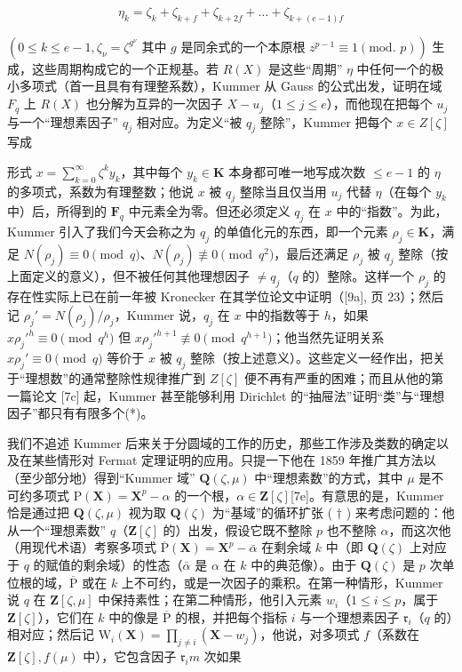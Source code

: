 \[
\eta_ {k} = \zeta_ {k} + \zeta_ {k + f} + \zeta_ {k + 2 f} + \dots + \zeta_ {k + (e - 1) f}
\]

\((0 \leqslant k \leqslant e - 1, \zeta_{\nu} = \zeta^{g^{\nu}} \text{ 其中 } g \text{ 是同余式的一个本原根 } z^{p-1} \equiv 1 (\text{mod. } p))\) 生成，这些周期构成它的一个正规基。若 \(R(X)\) 是这些“周期” \(\eta\) 中任何一个的极小多项式（首一且具有有理整系数），Kummer 从 Gauss 的公式出发，证明在域 \(F_q\) 上 \(R(X)\) 也分解为互异的一次因子 \(X - u_j\)（\(1 \leqslant j \leqslant e\)），而他现在把每个 \(u_j\) 与一个“理想素因子” \(q_j\) 相对应。为定义“被 \(q_j\) 整除”，Kummer 把每个 \(x \in Z[\zeta]\) 写成

形式 \(x = \sum_{k=0}^{\infty} \zeta^k y_k\)，其中每个 \(y_k \in \mathbf{K}\) 本身都可唯一地写成次数 \(\leqslant e - 1\) 的 \(\eta\) 的多项式，系数为有理整数；他说 \(x\) 被 \(q_j\) 整除当且仅当用 \(u_j\) 代替 \(\eta\)（在每个 \(y_k\) 中）后，所得到的 \(\mathbf{F}_q\) 中元素全为零。但还必须定义 \(q_j\) 在 \(x\) 中的“指数”。为此，Kummer 引入了我们今天会称之为 \(q_j\) 的单值化元的东西，即一个元素 \(\rho_j \in \mathbf{K}\)，满足 \(N(\rho_j) \equiv 0 \pmod{q}\)、\(N(\rho_j) \not\equiv 0 \pmod{q^2}\)，最后还满足 \(\rho_j\) 被 \(q_j\) 整除（按上面定义的意义），但不被任何其他理想因子 \(\neq q_j\)（\(q\) 的）整除。这样一个 \(\rho_j\) 的存在性实际上已在前一年被 Kronecker 在其学位论文中证明（{[}9a{]}, 页 23）；然后记 \(\rho_j' = N(\rho_j)/\rho_j\)，Kummer 说，\(q_j\) 在 \(x\) 中的指数等于 \(h\)，如果 \(x\rho_j'^h \equiv 0 \pmod{q^h}\) 但 \(x\rho_j'^{h+1} \not\equiv 0 \pmod{q^{h+1}}\)；他当然先证明关系 \(x\rho_j' \equiv 0 \pmod{q}\) 等价于 \(x\) 被 \(q_j\) 整除（按上述意义）。这些定义一经作出，把关于“理想数”的通常整除性规律推广到 \(Z[\zeta]\) 便不再有严重的困难；而且从他的第一篇论文 {[}7c{]} 起，Kummer 甚至能够利用 Dirichlet 的“抽屉法”证明“类”与“理想因子”都只有有限多个(*)。

我们不追述 Kummer 后来关于分圆域的工作的历史，那些工作涉及类数的确定以及在某些情形对 Fermat 定理证明的应用。只提一下他在 1859 年推广其方法以（至少部分地）得到“Kummer 域” \(\mathbf{Q}(\zeta, \mu)\) 中“理想素数”的方式，其中 \(\mu\) 是不可约多项式 \(\mathrm{P}(\mathbf{X}) = \mathbf{X}^p - \alpha\) 的一个根，\(\alpha \in \mathbf{Z}[\zeta]\){[}7e{]}。有意思的是，Kummer 恰是通过把 \(\mathbf{Q}(\zeta, \mu)\) 视为取 \(\mathbf{Q}(\zeta)\) 为“基域”的循环扩张 ( \(\dagger\) ) 来考虑问题的：他从一个“理想素数” \(q\)（\(\mathbf{Z}[\zeta]\) 的）出发，假设它既不整除 \(p\) 也不整除 \(\alpha\)，而这次他（用现代术语）考察多项式 \(\overline{\mathrm{P}}(\mathbf{X}) = \mathbf{X}^p - \bar{\alpha}\) 在剩余域 \(k\) 中（即 \(\mathbf{Q}(\zeta)\) 上对应于 \(q\) 的赋值的剩余域）的性态（\(\bar{\alpha}\) 是 \(\alpha\) 在 \(k\) 中的典范像）。由于 \(\mathbf{Q}(\zeta)\) 是 \(p\) 次单位根的域，\(\overline{\mathrm{P}}\) 或在 \(k\) 上不可约，或是一次因子的乘积。在第一种情形，Kummer 说 \(q\) 在 \(\mathbf{Z}[\zeta, \mu]\) 中保持素性；在第二种情形，他引入元素 \(w_i\)（\(1 \leqslant i \leqslant p\)，属于 \(\mathbf{Z}[\zeta]\)），它们在 \(k\) 中的像是 \(\overline{\mathrm{P}}\) 的根，并把每个指标 \(i\) 与一个理想素因子 \(\mathfrak{r}_i\)（\(q\) 的）相对应；然后记 \(\mathrm{W}_i(\mathbf{X}) = \prod_{j \neq i} (\mathbf{X} - w_j)\)，他说，对多项式 \(f\)（系数在 \(\mathbf{Z}[\zeta], f(\mu)\) 中），它包含因子 \(\mathfrak{r}_i m\) 次如果


